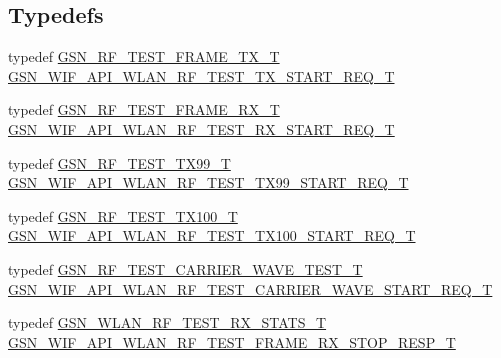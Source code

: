 \subsection*{Typedefs}
\begin{DoxyCompactItemize}
\item 
typedef \hyperlink{a00187}{GSN\_\-RF\_\-TEST\_\-FRAME\_\-TX\_\-T} \hyperlink{a00613_ab1ebe3ba2318fea51b5dcb7b15d536d8}{GSN\_\-WIF\_\-API\_\-WLAN\_\-RF\_\-TEST\_\-TX\_\-START\_\-REQ\_\-T}
\item 
typedef \hyperlink{a00186}{GSN\_\-RF\_\-TEST\_\-FRAME\_\-RX\_\-T} \hyperlink{a00613_ac24701fa77df0aa25ec5139ef211e7c5}{GSN\_\-WIF\_\-API\_\-WLAN\_\-RF\_\-TEST\_\-RX\_\-START\_\-REQ\_\-T}
\item 
typedef \hyperlink{a00190}{GSN\_\-RF\_\-TEST\_\-TX99\_\-T} \hyperlink{a00613_abe00514d5fae7a2ab36dfddb81e273b7}{GSN\_\-WIF\_\-API\_\-WLAN\_\-RF\_\-TEST\_\-TX99\_\-START\_\-REQ\_\-T}
\item 
typedef \hyperlink{a00189}{GSN\_\-RF\_\-TEST\_\-TX100\_\-T} \hyperlink{a00613_ace0b468f06c16f7280bcd6526ca3cad4}{GSN\_\-WIF\_\-API\_\-WLAN\_\-RF\_\-TEST\_\-TX100\_\-START\_\-REQ\_\-T}
\item 
typedef \hyperlink{a00185}{GSN\_\-RF\_\-TEST\_\-CARRIER\_\-WAVE\_\-TEST\_\-T} \hyperlink{a00613_a4218f0616007b23db811e90b3d9ebe40}{GSN\_\-WIF\_\-API\_\-WLAN\_\-RF\_\-TEST\_\-CARRIER\_\-WAVE\_\-START\_\-REQ\_\-T}
\item 
typedef \hyperlink{a00419}{GSN\_\-WLAN\_\-RF\_\-TEST\_\-RX\_\-STATS\_\-T} \hyperlink{a00613_acebb8ead84786521e21b9c81a1689b77}{GSN\_\-WIF\_\-API\_\-WLAN\_\-RF\_\-TEST\_\-FRAME\_\-RX\_\-STOP\_\-RESP\_\-T}
\end{DoxyCompactItemize}
